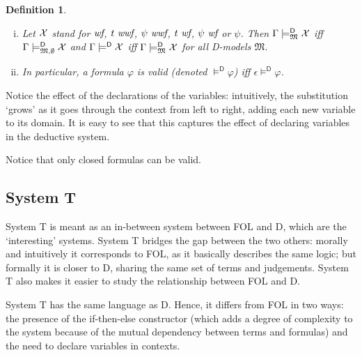 \documentclass{article}
\newtheorem{definition}{Definition}[section]
\newcommand{\D}{\textsf D}
\newcommand{\T}{\textsf T}
\newcommand{\FOL}{\textsf{FOL}}
\newcommand{\ifte}{\textsf{if-then-else}}
\newcommand{\ok}{\mbox{\em wf}}
\newcommand{\wf}{\ \mbox{\em wf}}
\newcommand{\wwf}{\ \mbox{\em wwf}}
\newcommand{\mymodels}[1]{\ensuremath{\models^{\mathsf{#1}}}}
\newcommand{\mymodelsm}[2]{\ensuremath{\models_{\mathfrak{#2}}^{\mathsf{#1}}}}
\newcommand{\mymodelss}[3]{\ensuremath{\models_{\mathfrak{#2},{#3}}^{\mathsf{#1}}}}
\newcommand{\yields}[1]{\ensuremath{\models^{\mathsf{#1}}}}
\begin{document}
\begin{definition}
\begin{enumerate}[(i)]
\begin{enumerate}
\item $\varphi,\Gamma\mymodelss{D}M\rho\psi$ iff
(1) $\mymodelss{D}M\rho\varphi$ and $\Gamma\mymodelss{D}M\rho\psi$ or
(2) $\mymodelss{D}M\rho\neg\varphi$ and $\Gamma\mymodelss{D}M\rho\psi\wwf$;
\item $x_i,\Gamma\mymodelss{D}M\rho\psi$ iff
$\Gamma\mymodelss{D}M{\rho[x_i:=a]}\psi$ for all $a\in A$.
\end{enumerate}
\item Let $\cal X$ stand for $\ok$, $t\wwf$, $\psi\wwf$, $t\wf$,
$\psi\wf$ or $\psi$.  Then $\Gamma\mymodelsm{D}M\cal X$ iff
$\Gamma\mymodelss{D}M\emptyset\cal X$ and $\Gamma\yields{D}\cal X$ iff
$\Gamma\mymodelsm{D}M\cal X$ for all {\D}-models $\mathfrak M$.
\item In particular, a formula $\varphi$ is valid (denoted
$\mymodels{D}\varphi$) iff $\epsilon\yields{D}\varphi$.
\end{enumerate}
\end{definition}

Notice the effect of the declarations of the variables: intuitively,
the substitution `grows' as it goes through the context from left to
right, adding each new variable to its domain.  It is easy to see
that this captures the effect of declaring variables in the deductive
system.

Notice that only closed formulas can be valid.

\subsection{System {\T}}

System {\T} is meant as an in-between system between {\FOL} and {\D}, which
are the `interesting' systems.
System {\T} bridges the gap between the two others: morally
and intuitively it corresponds to {\FOL}, as it basically describes the
same logic; but formally it is closer to {\D}, sharing the same set of
terms and judgements.  System {\T} also makes it easier to study the
relationship between {\FOL} and {\D}.

System {\T} has the same language as {\D}.  Hence, it differs from
{\FOL} in two ways: the presence of the {\ifte} constructor (which
adds a degree of complexity to the system because of the mutual
dependency between terms and formulas) and the need to declare
variables in contexts.
\end{document}
